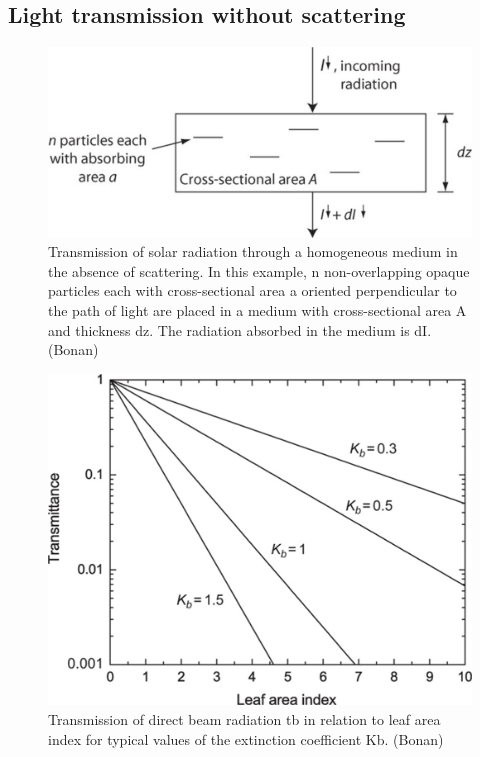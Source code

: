 \documentclass[
  oneside]{book}
\begin{document}
\hypertarget{light-transmission-without-scattering}{%
\subsection{Light transmission without scattering}\label{light-transmission-without-scattering}}

\begin{figure}

{\centering \includegraphics[width=0.8\linewidth]{figures/chap3/f39_beer} 

}

\caption{Transmission of solar radiation through a homogeneous medium in the absence of scattering. In this example, n non-overlapping opaque particles each with cross-sectional area a oriented perpendicular to the path of light are placed in a medium with cross-sectional area A and thickness dz. The radiation absorbed in the medium is dI.(Bonan)}\label{fig:f39}
\end{figure}

\begin{figure}

{\centering \includegraphics[width=0.8\linewidth]{figures/chap3/f310_Kb} 

}

\caption{Transmission of direct beam radiation tb in relation to leaf area index for typical values of the extinction coefficient Kb. (Bonan)}\label{fig:f310}
\end{figure}
\end{document}
